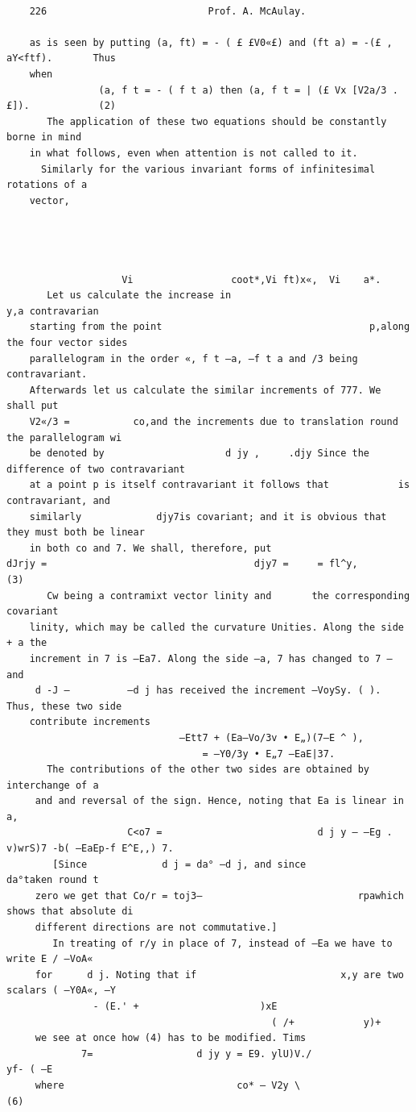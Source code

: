 \documentclass[10pt]{article}
\begin{document}
\clearpage
\begin{verbatim}

    226                            Prof. A. McAulay.

    as is seen by putting (a, ft) = - ( £ £V0«£) and (ft a) = -(£ , aY<ftf).       Thus
    when
                (a, f t = - ( f t a) then (a, f t = | (£ Vx [V2a/3 . £]).            (2)
       The application of these two equations should be constantly borne in mind
    in what follows, even when attention is not called to it.
      Similarly for the various invariant forms of infinitesimal rotations of a
    vector,




                    Vi                 coot*,Vi ft)x«,  Vi    a*.
       Let us calculate the increase in                                         y,a contravarian
    starting from the point                                    p,along the four vector sides
    parallelogram in the order «, f t —a, —f t a and /3 being contravariant.
    Afterwards let us calculate the similar increments of 777. We shall put
    V2«/3 =           co,and the increments due to translation round the parallelogram wi
    be denoted by                     d jy ,     .djy Since the difference of two contravariant
    at a point p is itself contravariant it follows that            is contravariant, and
    similarly             djy7is covariant; and it is obvious that they must both be linear
    in both co and 7. We shall, therefore, put
dJrjy =                                    djy7 =     = fl^y,                         (3)
       Cw being a contramixt vector linity and       the corresponding covariant
    linity, which may be called the curvature Unities. Along the side + a the
    increment in 7 is —Ea7. Along the side —a, 7 has changed to 7 —         and
     d -J —          —d j has received the increment —VoySy. ( ). Thus, these two side
    contribute increments
                              —Ett7 + (Ea—Vo/3v • E„)(7—E ^ ),
                                  = —Y0/3y • E„7 —EaE|37.
       The contributions of the other two sides are obtained by interchange of a
     and and reversal of the sign. Hence, noting that Ea is linear in a,
                     C<o7 =                           d j y — —Eg . v)wrS)7 -b( —EaEp-f E^E,,) 7.
        [Since             d j = da° —d j, and since                        da°taken round t
     zero we get that Co/r = toj3—                           rpawhich shows that absolute di
     different directions are not commutative.]
        In treating of r/y in place of 7, instead of —Ea we have to write E / —VoA«
     for      d j. Noting that if                         x,y are two scalars ( —Y0A«, —Y
               - (E.' +                     )xE
                                              ( /+            y)+
     we see at once how (4) has to be modified. Tims
             7=                  d jy y = E9. ylU)V./                                     yf- ( —E
     where                              co* — V2y \                                   (6)


\end{verbatim}
\end{document}
